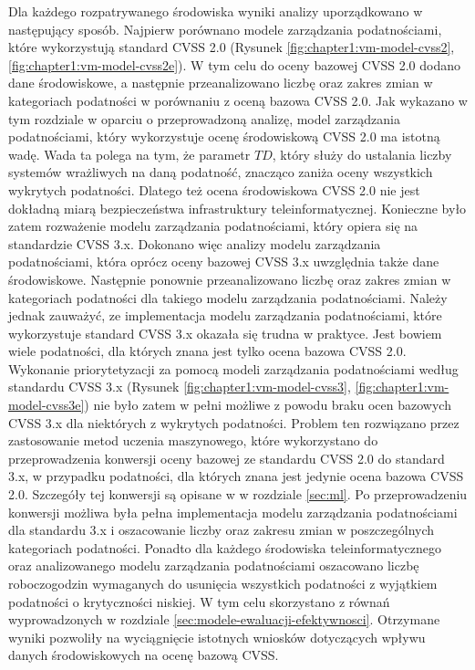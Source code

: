 \bigbreak
Dla każdego rozpatrywanego środowiska wyniki analizy uporządkowano w następujący sposób. Najpierw porównano modele zarządzania podatnościami, które wykorzystują standard CVSS 2.0 (Rysunek \ref{fig:chapter1:vm-model-cvss2}, \ref{fig:chapter1:vm-model-cvss2e}). W tym celu do oceny bazowej CVSS 2.0 dodano dane środowiskowe, a następnie przeanalizowano liczbę oraz zakres zmian w kategoriach podatności w porównaniu z oceną bazowa CVSS 2.0. Jak wykazano w tym rozdziale w oparciu o przeprowadzoną analizę, model zarządzania podatnościami, który wykorzystuje ocenę środowiskową CVSS 2.0 ma istotną wadę. Wada ta polega na tym, że parametr $TD$, który służy do ustalania liczby systemów wrażliwych na daną podatność, znacząco zaniża oceny wszystkich wykrytych podatności. Dlatego też ocena środowiskowa CVSS 2.0 nie jest dokładną miarą bezpieczeństwa infrastruktury teleinformatycznej. Konieczne było zatem rozważenie modelu zarządzania podatnościami, który opiera się na standardzie CVSS 3.x. Dokonano więc analizy modelu zarządzania podatnościami, która oprócz oceny bazowej CVSS 3.x uwzględnia także dane środowiskowe. Następnie ponownie przeanalizowano liczbę oraz zakres zmian w kategoriach podatności dla takiego modelu zarządzania podatnościami. Należy jednak zauważyć, ze implementacja modelu zarządzania podatnościami, które wykorzystuje standard CVSS 3.x okazała się trudna w praktyce. Jest bowiem wiele podatności, dla których znana jest tylko ocena bazowa CVSS 2.0. Wykonanie priorytetyzacji za pomocą modeli zarządzania podatnościami według standardu CVSS 3.x (Rysunek \ref{fig:chapter1:vm-model-cvss3}, \ref{fig:chapter1:vm-model-cvss3e}) nie było zatem w pełni możliwe z powodu braku ocen bazowych CVSS 3.x dla niektórych z wykrytych podatności. Problem ten rozwiązano przez zastosowanie metod uczenia maszynowego, które wykorzystano do przeprowadzenia konwersji oceny bazowej ze standardu CVSS 2.0 do standard 3.x, w przypadku podatności, dla których znana jest jedynie ocena bazowa CVSS 2.0. Szczegóły tej konwersji są opisane w w rozdziale \ref{sec:ml}. Po przeprowadzeniu konwersji możliwa była pełna implementacja modelu zarządzania podatnościami dla standardu 3.x i oszacowanie liczby oraz zakresu zmian w poszczególnych kategoriach podatności. Ponadto dla każdego środowiska teleinformatycznego oraz analizowanego modelu zarządzania podatnościami oszacowano liczbę roboczogodzin wymaganych do usunięcia wszystkich podatności z wyjątkiem podatności o krytyczności niskiej. W tym celu skorzystano z równań wyprowadzonych w rozdziale \ref{sec:modele-ewaluacji-efektywnosci}. Otrzymane wyniki pozwoliły na wyciągnięcie istotnych wniosków dotyczących wpływu danych środowiskowych na ocenę bazową CVSS.

